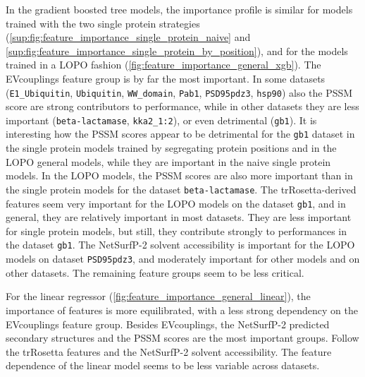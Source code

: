 In the gradient boosted tree models, the importance profile is similar for models trained with the two single protein strategies (\autoref{sup:fig:feature_importance_single_protein_naive} and \autoref{sup:fig:feature_importance_single_protein_by_position}), and for the models trained in a LOPO fashion (\autoref{fig:feature_importance_general_xgb}).
The EVcouplings feature group is by far the most important.
In some datasets (\texttt{E1\_Ubiquitin}, \texttt{Ubiquitin}, \texttt{WW\_domain}, \texttt{Pab1}, \texttt{PSD95pdz3}, \texttt{hsp90}) also the PSSM score are strong contributors to performance, while in other datasets they are less important (\texttt{beta-lactamase}, \texttt{kka2\_1:2}), or even detrimental (\texttt{gb1}).
It is interesting how the PSSM scores appear to be detrimental for the \texttt{gb1} dataset in the single protein models trained by segregating protein positions and in the LOPO general models, while they are important in the naive single protein models.
In the LOPO models, the PSSM scores are also more important than in the single protein models for the dataset \texttt{beta-lactamase}.
The trRosetta-derived features seem very important for the LOPO models on the dataset \texttt{gb1}, and in general, they are relatively important in most datasets.
They are less important for single protein models, but still, they contribute strongly to performances in the dataset \texttt{gb1}.
The NetSurfP-2 solvent accessibility is important for the LOPO models on dataset \texttt{PSD95pdz3}, and moderately important for other models and on other datasets.
The remaining feature groups seem to be less critical.

For the linear regressor (\autoref{fig:feature_importance_general_linear}), the importance of features is more equilibrated, with a less strong dependency on the EVcouplings feature group.
Besides EVcouplings, the NetSurfP-2 predicted secondary structures and the PSSM scores are the most important groups.
Follow the trRosetta features and the NetSurfP-2 solvent accessibility.
The feature dependence of the linear model seems to be less variable across datasets.

\begin{figure}[p]
\end{figure}

